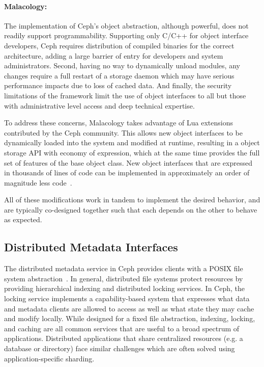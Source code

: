 \documentclass[preprint]{sigplanconf-eurosys}
\begin{document}
\paragraph*{Malacology:} The implementation of Ceph's object abstraction,
although powerful, does not readily support programmability. Supporting only
C/C++ for object interface developers, Ceph requires distribution of compiled
binaries for the correct architecture, adding a large barrier of entry for
developers and system administrators. Second, having no way to dynamically
unload modules, any changes require a full restart of a storage daemon which
may have serious performance impacts due to loss of cached data. And finally,
the security limitations of the framework limit the use of object interfaces to
all but those with administrative level access and deep technical expertise.

To address these concerns, Malacology takes advantage of Lua extensions
contributed by the Ceph community. This allows new object interfaces to be
dynamically loaded into the system and modified at runtime, resulting in a
object storage API with economy of expression, which at the same time provides
the full set of features of the base object class. New object interfaces that
are expressed in thousands of lines of code can be implemented in approximately
an order of magnitude less code~\cite{geambasu_comet_2010}.

All of these modifications work in tandem to implement the desired behavior,
and are typically co-designed together such that each depends on the other to
behave as expected. 

\subsection{Distributed Metadata Interfaces}
\label{malacology:mds}

The distributed metadata service in Ceph provides clients with a POSIX file
system abstraction~\cite{weil:sc2004-dyn-metadata}. In general, distributed
file systems protect resources by providing hierarchical indexing and
distributed locking services.  In Ceph, the locking service implements a
capability-based system that expresses what data and metadata clients are
allowed to access as well as what state they may cache and modify locally.
While designed for a fixed file abstraction, indexing, locking, and caching are
all common services that are useful to a broad spectrum of applications.
Distributed applications that share centralized resources (e.g. a database or
directory) face similar challenges which are often solved using
application-specific sharding. 
\end{document}
